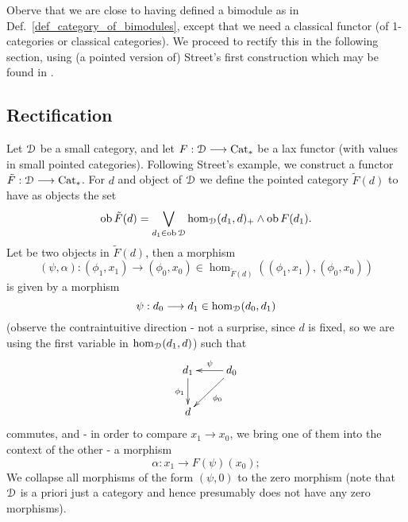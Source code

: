     Oberve that we are close to having defined a bimodule as in Def.~\ref{def_category_of_bimodules}, except that we need a classical functor (of 1-categories or classical categories). We proceed to rectify this in the following section, using (a pointed version of) Street's first construction which may be found in \cite[p.~225]{street1972two}.

  \subsection{Rectification}

    \begin{defn}\label{def_streets_first_construction_functor}
      Let $\mathcal{D}$ be a small category, and let $F: \mathcal{D} \longrightarrow \mathrm{Cat}_*$ be a lax functor (with values in small pointed categories).
      Following Street's example, we construct a functor $\tilde{F}: \mathcal{D} \longrightarrow \mathrm{Cat}_*$.
      For $d$ and object of $\mathcal{D}$ we define the pointed category $\tilde{F}(d)$ to have as objects the set 
      \begin{displaymath}
        \operatorname{ob} \tilde{F}(d) = \bigvee_{d_1 \in \operatorname{ob} \mathcal{D}} \operatorname{hom}_{\mathcal{D}}(d_1,d)_+ \wedge \operatorname{ob} F(d_1).
      \end{displaymath}
      Let 
      be two objects in $\tilde{F}(d)$, then a morphism 
      \begin{displaymath}
        (\psi, \alpha) \colon (\phi_1,x_1) \to (\phi_0,x_0) \in \hom_{\tilde{F}(d)}((\phi_1,x_1), (\phi_0,x_0))
      \end{displaymath}  
      is given by a morphism 
      \begin{displaymath}
        \psi: d_0 \longrightarrow d_1 \in \operatorname{hom}_{\mathcal{D}}(d_0,d_1)
      \end{displaymath}  
      (observe the contraintuitive direction - not a surprise, since $d$ is fixed, so we are using the first variable in $\operatorname{hom}_{\mathcal{D}}(d_1,d)$) such that 
      \begin{displaymath}
        \xymatrix{
          d_1 \ar[d]_{\phi_1} & d_0 \ar[l]_{\psi} \ar[dl]^{\phi_0} \\
          d
        }
      \end{displaymath}  
      commutes, and - in order to compare $x_1 \to x_0$, we bring one of them into the context of the other - a morphism 
      \begin{displaymath}
        \alpha \colon x_1 \to F(\psi)(x_0);
      \end{displaymath}  
      We collapse all morphisms of the form $(\psi,0)$ to the zero morphism (note that $\mathcal{D}$ is a priori just a category and hence presumably does not have any zero morphisms).

\end{defn}
